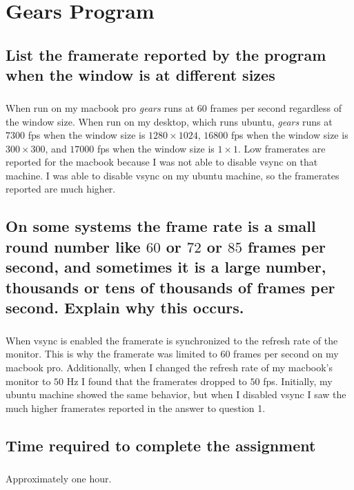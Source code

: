 \documentclass[11pt]{article}
\begin{document}
\thispagestyle{empty}

\newlength{\boxlength}\setlength{\boxlength}{\textwidth}
\addtolength{\boxlength}{-4mm}

\begin{center}
\end{center}




\section{Gears Program}

\subsection{List the framerate reported by the program when the window is at different sizes}

\subparagraph{}

When run on my macbook pro \textit{gears} runs at $60$ frames per second regardless of the window size. When run on my desktop, which runs ubuntu, \textit{gears} runs at $7300$ fps when the window size is $1280\times1024$, $16800$ fps when the window size is $300\times300$, and $17000$ fps when the window size is $1\times1$. Low framerates are reported for the macbook because I was not able to disable vsync on that machine. I was able to disable vsync on my ubuntu machine, so the framerates reported are much higher.

\subsection{On some systems the frame rate is a small round number like $60$ or $72$ or $85$ frames per second, and sometimes it is a large number, thousands or tens of thousands of frames per second. Explain why this occurs.}

\subparagraph{}

When vsync is enabled the framerate is synchronized to the refresh rate of the monitor. This is why the framerate was limited to $60$ frames per second on my macbook pro. Additionally, when I changed the refresh rate of my macbook's monitor to $50$ Hz I found that the framerates dropped to $50$ fps. Initially, my ubuntu machine showed the same behavior, but when I disabled vsync I saw the much higher framerates reported in the answer to question 1. 

\subsection{Time required to complete the assignment}

\subparagraph{}

Approximately one hour.
\end{document}
